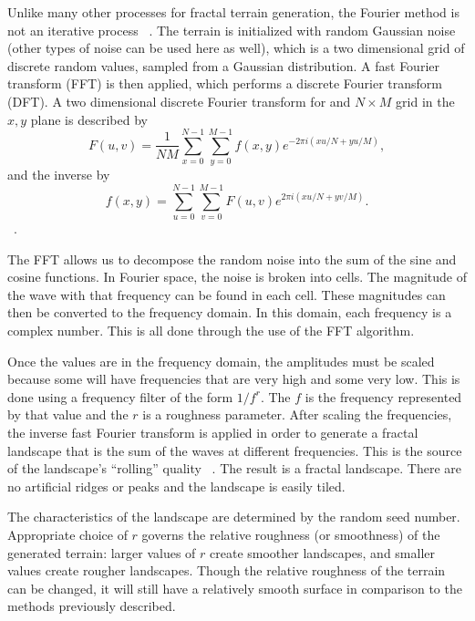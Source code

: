 \documentclass[11pt,twocolumn]{article}
\begin{document}
	Unlike many other processes for fractal terrain generation, the Fourier method is not an iterative process ~\cite{Kareem}.
	The terrain is initialized with random Gaussian noise (other types of noise can be used here as well), which is a two dimensional
	grid of discrete random values, sampled from a Gaussian distribution. A fast Fourier transform (FFT) is then applied, which performs a discrete
	Fourier transform (DFT). A two dimensional discrete Fourier transform for and $N \times M$ grid in the $x, y$ plane is described by
	$$F(u,v)=\frac{1}{NM}\displaystyle\sum\limits_{x=0}^{N-1} \displaystyle\sum\limits_{y=0}^{M-1} f(x,y)e^{-2\pi i(xu/N+yu/M)},$$
	and the inverse by
	$$f(x,y)=\displaystyle\sum\limits_{u=0}^{N-1} \displaystyle\sum\limits_{v=0}^{M-1} F(u,v)e^{2\pi i(xu/N+yv/M)}.$$ ~\cite{CooleyTukey}.

	The FFT allows us to decompose the random noise into the sum of the sine and cosine functions. In Fourier space, the noise is broken
	into cells. The magnitude of the wave with that frequency can be found in each cell. These magnitudes can then be converted to
	the frequency domain. In this domain, each frequency is a complex number. This is all done through the use of the FFT algorithm.
	
	Once the values are in the frequency domain, the amplitudes must be scaled because some will have frequencies that are very high and
	some very low. This is done using a frequency filter of the form $1/f^{r}$. The $f$ is the frequency represented by that
	value and the $r$ is a roughness parameter. After scaling the frequencies, the inverse fast Fourier transform is applied
	in order to generate a fractal landscape that is the sum of the waves at different frequencies. This is the source of the landscape's
	``rolling'' quality ~\cite{Kareem}. The result is a fractal landscape. There are no artificial ridges or peaks and the landscape is easily tiled.
	
	The characteristics of the landscape are determined by the random seed number. Appropriate choice of $r$ governs the relative
	roughness (or smoothness) of the generated terrain: larger values of $r$ create smoother landscapes, and smaller
	values create rougher landscapes. Though the relative roughness of the terrain can be changed, it will still have
	a relatively smooth surface in comparison to the methods previously described.  
\end{document}
